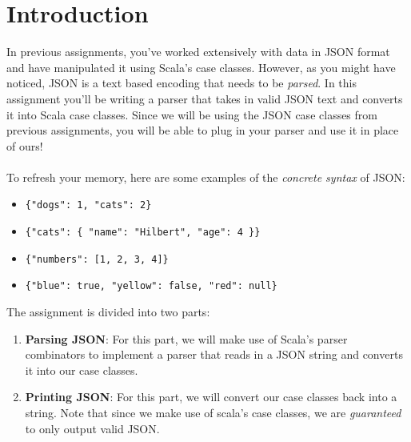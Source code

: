 
\section{Introduction}
In previous assignments, you've worked extensively with data in JSON format and
have manipulated it using Scala's case classes. However, as you might have
noticed, JSON is a text based encoding that needs to be \textit{parsed}. In
this assignment you'll be writing a parser that takes in valid JSON text and
converts it into Scala case classes. Since we will be using the JSON case
classes from previous assignments, you will be able to plug in your parser and
use it in place of ours!
\\ \\
To refresh your memory, here are some examples of the \textit{concrete syntax}
of JSON:
\begin{itemize}
    \item \lstinline|{"dogs": 1, "cats": 2}|
    \item \lstinline|{"cats": { "name": "Hilbert", "age": 4 }}|
    \item \lstinline|{"numbers": [1, 2, 3, 4]}|
    \item \lstinline|{"blue": true, "yellow": false, "red": null}|
\end{itemize}
The assignment is divided into two parts:
\begin{enumerate}
    \item \textbf{Parsing JSON}: For this part, we will make use of Scala's
    parser combinators to implement a parser that reads in a JSON string and
    converts it into our case classes.
    \item \textbf{Printing JSON}: For this part, we will convert our case classes
    back into a string. Note that since we make use of scala's case classes,
    we are \textit{guaranteed} to only output valid JSON.
\end{enumerate}

